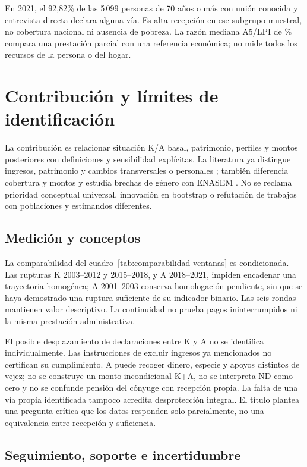 En 2021, el 92{,}82\% de las 5\,099 personas de 70 años o más con unión
conocida y entrevista directa declara alguna vía. Es alta recepción en ese
subgrupo muestral, no cobertura nacional ni ausencia de pobreza. La razón
mediana A5/LPI de \% compara una prestación parcial con una
referencia económica; no mide todos los recursos de la persona o del hogar.

\section{Contribución y límites de identificación}

La contribución es relacionar situación K/A basal, patrimonio, perfiles y
montos posteriores con definiciones y sensibilidad explícitas. La literatura
ya distingue ingresos, patrimonio y cambios transversales o personales
\citep{degraff2018}; también diferencia cobertura y montos
\citep{perezarce2021} y estudia brechas de género con ENASEM
\citep{garciagarcia2025}. No se reclama prioridad conceptual universal,
innovación en bootstrap o refutación de trabajos con poblaciones y estimandos
diferentes.

\subsection{Medición y conceptos}

La comparabilidad del cuadro~\ref{tab:comparabilidad-ventanas} es condicionada.
Las rupturas K 2003--2012 y 2015--2018, y A 2018--2021, impiden encadenar
una trayectoria homogénea; A 2001--2003 conserva homologación pendiente,
sin que se haya demostrado una ruptura suficiente de su indicador binario.
Las seis rondas mantienen valor descriptivo. La continuidad no prueba pagos
ininterrumpidos ni la misma prestación administrativa.

El posible desplazamiento de declaraciones entre K y A no se identifica
individualmente. Las instrucciones de excluir ingresos ya mencionados no
certifican su cumplimiento. A puede recoger dinero, especie y apoyos distintos
de vejez; no se construye un monto incondicional K+A, no se interpreta ND
como cero y no se confunde pensión del cónyuge con recepción propia.
La falta de una vía propia identificada tampoco acredita desprotección
integral. El título plantea una pregunta crítica que los datos responden
solo parcialmente, no una equivalencia entre recepción y suficiencia.

\subsection{Seguimiento, soporte e incertidumbre}

